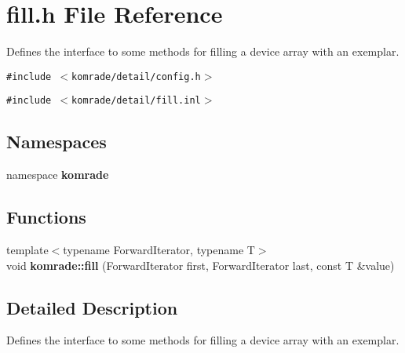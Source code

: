 \section{fill.h File Reference}
\label{fill_8h}
Defines the interface to some methods for filling a device array with an exemplar. 

{\tt \#include $<$komrade/detail/config.h$>$}\par
{\tt \#include $<$komrade/detail/fill.inl$>$}\par
\subsection*{Namespaces}
\begin{CompactItemize}
\item 
namespace {\bf komrade}
\end{CompactItemize}
\subsection*{Functions}
\begin{CompactItemize}
\item 
{\footnotesize template$<$typename ForwardIterator, typename T$>$ }\\void {\bf komrade::fill} (ForwardIterator first, ForwardIterator last, const T \&value)
\end{CompactItemize}


\subsection{Detailed Description}
Defines the interface to some methods for filling a device array with an exemplar. 

